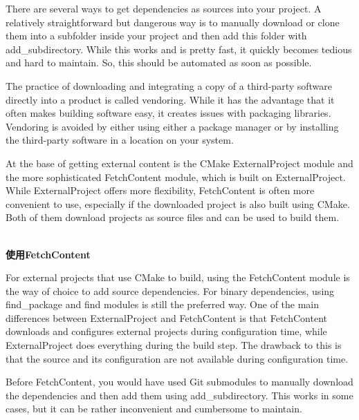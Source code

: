 

There are several ways to get dependencies as sources into your project. A relatively straightforward but dangerous way is to manually download or clone them into a subfolder inside your project and then add this folder with add\_subdirectory. While this works and is pretty fast, it quickly becomes tedious and hard to maintain. So, this should be automated as soon as possible.

\begin{tcolorbox}[colback=webgreen!5!white,colframe=webgreen!75!black,title=Note]
The practice of downloading and integrating a copy of a third-party software directly into a product is called vendoring. While it has the advantage that it often makes building software easy, it creates issues with packaging libraries. Vendoring is avoided by either using either a package manager or by installing the third-party software in a location on your system.
\end{tcolorbox}


At the base of getting external content is the CMake ExternalProject module and the more sophisticated FetchContent module, which is built on ExternalProject. While ExternalProject offers more flexibility, FetchContent is often more convenient to use, especially if the downloaded project is also built using CMake. Both of them download projects as source files and can be used to build them.

\hspace*{\fill} \\ %
\noindent
\textbf{使用FetchContent}

For external projects that use CMake to build, using the FetchContent module is the way of choice to add source dependencies. For binary dependencies, using find\_package and find modules is still the preferred way. One of the main differences between ExternalProject and FetchContent is that FetchContent downloads and configures external projects during configuration time, while ExternalProject does everything during the build step. The drawback to this is that the source and its configuration are not available during configuration time.

Before FetchContent, you would have used Git submodules to manually download the dependencies and then add them using add\_subdirectory. This works in some cases, but it can be rather inconvenient and cumbersome to maintain.

